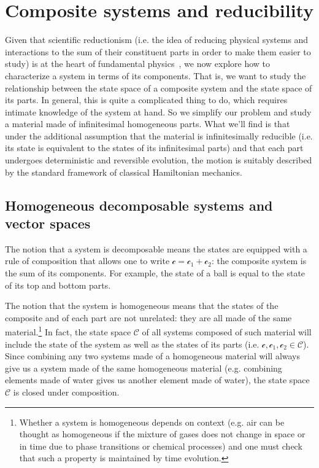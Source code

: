 \documentclass[smallextended]{svjour3}
\numberwithin{equation}{section}
\theoremstyle{definition}
\begin{document}
\section{Composite systems and reducibility}
\label{sec:reducibility}


Given that scientific reductionism (i.e. the idea of reducing physical systems and interactions to the sum of their constituent parts in order to make them easier to study) is at the heart of fundamental physics~\cite{Ruse}, we now explore how to characterize a system in terms of its components. That is, we want to study the relationship between the state space of a composite system and the state space of its parts. In general, this is quite a complicated thing to do, which requires intimate knowledge of the system at hand. So we simplify our problem and study a material made of infinitesimal homogeneous parts. What we'll find is that under the additional assumption that the material is infinitesimally reducible (i.e. its state is equivalent to the states of its infinitesimal parts) and that each part undergoes deterministic and reversible evolution, the motion is suitably described by the standard framework of classical Hamiltonian mechanics.

\subsection{Homogeneous decomposable systems and vector spaces}
The notion that a system is decomposable means the states are equipped with a rule of composition that allows one to write $\mathcal{c}=\mathcal{c}_1+\mathcal{c}_2$: the composite system is the sum of its components. For example, the state of a ball is equal to the state of its top and bottom parts.

The notion that the system is homogeneous means that the states of the composite and of each part are not unrelated: they are all made of the same material.\footnote{Whether a system is homogeneous depends on context (e.g. air can be thought as homogeneous if the mixture of gases does not change in space or in time due to phase transitions or chemical processes) and one must check that such a property is maintained by time evolution.} In fact, the state space $\mathcal{C}$ of all systems composed of such material will include the state of the system as well as the states of  its parts (i.e. $\mathcal{c}, \mathcal{c}_1, \mathcal{c}_2 \in \mathcal{C}$). Since combining any two systems made of a homogeneous material will always give us a system made of the same homogeneous material (e.g. combining elements made of water gives us another element made of water), the state space $\mathcal{C}$ is closed under composition.
\end{document}
